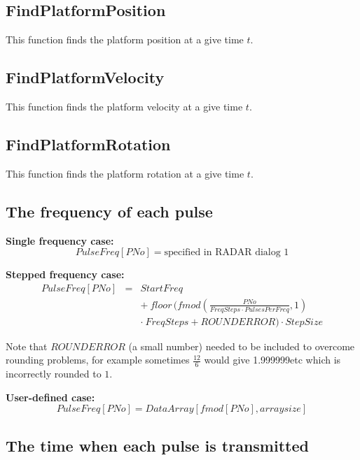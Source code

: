 \normalsize%

\subsection{FindPlatformPosition}

This function finds the platform position at a give time $t$.

\subsection{FindPlatformVelocity}

This function finds the platform velocity at a give time $t$.

\subsection{FindPlatformRotation}

This function finds the platform rotation at a give time $t$.

\subsection{The frequency of each pulse}

\textbf{Single frequency case:}\emph{\ } 
\begin{equation}
PulseFreq[PNo]=\text{specified in RADAR dialog 1}
\end{equation}

\textbf{Stepped frequency case:}\emph{\ } 
\begin{eqnarray}
PulseFreq[PNo] &=&StartFreq  \nonumber \\
&&+~floor\,(fmod\left( \frac{PNo}{FreqSteps\cdot PulsesPerFreq},1\right) 
\nonumber \\
&&\cdot ~FreqSteps+ROUNDERROR)\cdot StepSize
\end{eqnarray}

Note that $ROUNDERROR$ (a small number) needed to be included to overcome
rounding problems, for example sometimes $\frac{12}{6}$ would give
1.999999etc which is incorrectly rounded to $1$.

\textbf{User-defined case:}\emph{\ } 
\begin{equation}
PulseFreq[PNo]=DataArray[fmod[PNo],arraysize]
\end{equation}

\subsection{The time when each pulse is transmitted}

